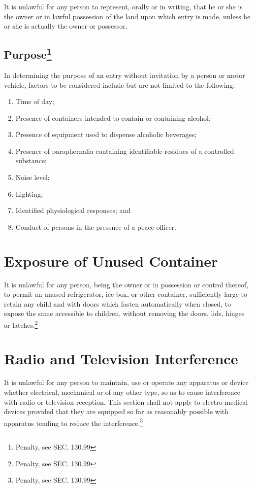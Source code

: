 \subsubsection{}
It is unlawful for any person to represent, orally or in writing, that he or she is the owner or in lawful possession of the land upon which entry is made, unless he or she is actually the owner or possessor.
\subsection{Purpose\footnote{Penalty, see SEC. 130.99}}
In determining the purpose of an entry without invitation by a person or motor vehicle, factors to be considered include but are not limited to the following:
\begin{enumerate}[{\indent}1)]
    \item Time of day; 
    \item Presence of containers intended to contain or containing alcohol; 
    \item Presence of equipment used to dispense alcoholic beverages; 
    \item Presence of paraphernalia containing identifiable residues of a controlled substance; 
    \item Noise level; 
    \item Lighting; 
    \item Identified physiological responses; and 
    \item Conduct of persons in the presence of a peace officer.
\end{enumerate}

\section{Exposure of Unused Container}
It is unlawful for any person, being the owner or in possession or control thereof, to permit an unused refrigerator, ice box, or other container, sufficiently large to retain any child and with doors which fasten automatically when closed, to expose the same accessible to children, without removing the doors, lids, hinges or latches.\footnote{Penalty, see SEC. 130.99}

\section{Radio and Television Interference}
It is unlawful for any person to maintain, use or operate any apparatus or device whether electrical, mechanical or of any other type, so as to cause interference with radio or television reception. This section shall not apply to electro-medical devices provided that they are equipped so far as reasonably possible with apparatus tending to reduce the interference.\footnote{Penalty, see SEC. 130.99}

